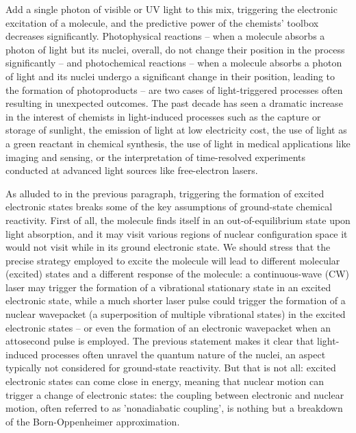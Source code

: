 \documentclass[9pt,bestpractices]{livecoms}
\begin{document}
Add a single photon of visible or UV light to this mix, triggering the electronic excitation of a molecule, and the predictive power of the chemists' toolbox decreases significantly. Photophysical reactions -- when a molecule absorbs a photon of light but its nuclei, overall, do not change their position in the process significantly -- and photochemical reactions -- when a molecule absorbs a photon of light and its nuclei undergo a significant change in their position, leading to the formation of photoproducts -- are two cases of light-triggered processes often resulting in unexpected outcomes. The past decade has seen a dramatic increase in the interest of chemists in light-induced processes such as the capture or storage of sunlight,\cite{ponseca2017ultrafast} the emission of light at low electricity cost,\cite{hong2021brief} the use of light as a green reactant in chemical synthesis,\cite{protti2009contribution} the use of light in medical applications like imaging and sensing,\cite{gautier2022fluorescence,shi2019recent} or the interpretation of time-resolved experiments conducted at advanced light sources like free-electron lasers.\cite{chergui2009electron}

As alluded to in the previous paragraph, triggering the formation of excited electronic states breaks some of the key assumptions of ground-state chemical reactivity. First of all, the molecule finds itself in an out-of-equilibrium state upon light absorption, and it may visit various regions of nuclear configuration space it would not visit while in its ground electronic state. We should stress that the precise strategy employed to excite the molecule will lead to different molecular (excited) states and a different response of the molecule: a continuous-wave (CW) laser may trigger the formation of a vibrational stationary state in an excited electronic state, while a much shorter laser pulse could trigger the formation of a nuclear wavepacket (a superposition of multiple vibrational states) in the excited electronic states\cite{suchan2018importance} -- or even the formation of an electronic wavepacket when an attosecond pulse is employed. The previous statement makes it clear that light-induced processes often unravel the quantum nature of the nuclei, an aspect typically not considered for ground-state reactivity. But that is not all: excited electronic states can come close in energy, meaning that nuclear motion can trigger a change of electronic states: the coupling between electronic and nuclear motion, often referred to as 'nonadiabatic coupling', is nothing but a breakdown of the Born-Oppenheimer approximation. 
\end{document}

